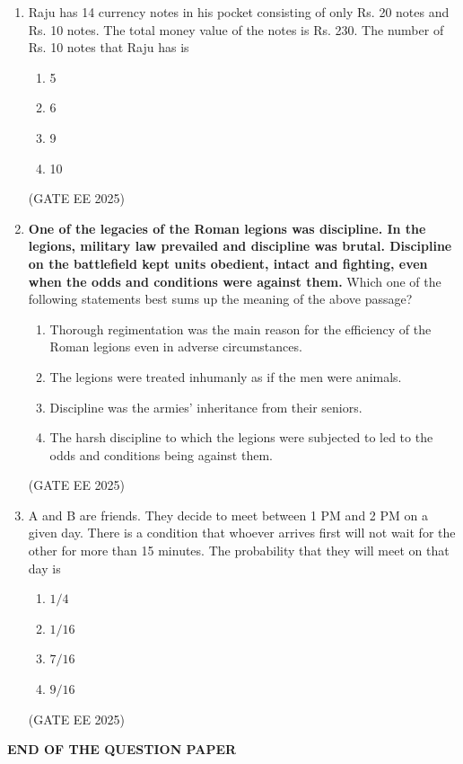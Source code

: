 \documentclass[11pt, letterpaper]{article}
\theoremstyle{remark}
\begin{document}
\begin{enumerate}
\item Raju has 14 currency notes in his pocket consisting of only Rs. 20 notes and Rs. 10 notes. The total money value of the notes is Rs. 230. The number of Rs. 10 notes that Raju has is
\begin{multicols}{2}
\begin{enumerate}  
\item 5
\item 6
\item 9
\item 10
\end{enumerate}
\end{multicols}
\hfill(GATE EE 2025)

\item \textbf{One of the legacies of the Roman legions was discipline. In the legions, military law prevailed and discipline was brutal. Discipline on the battlefield kept units obedient, intact and fighting, even when the odds and conditions were against them.}
Which one of the following statements best sums up the meaning of the above passage?
\begin{multicols}{2}
\begin{enumerate}  
\item Thorough regimentation was the main reason for the efficiency of the Roman legions even in adverse circumstances.
\item The legions were treated inhumanly as if the men were animals.
\item Discipline was the armies' inheritance from their seniors.
\item The harsh discipline to which the legions were subjected to led to the odds and conditions being against them.
\end{enumerate}
\end{multicols}
\hfill(GATE EE 2025)

\item A and B are friends. They decide to meet between 1 PM and 2 PM on a given day. There is a condition that whoever arrives first will not wait for the other for more than 15 minutes. The probability that they will meet on that day is
\begin{multicols}{2}
\begin{enumerate}  
\item $1/4$
\item $1/16$
\item $7/16$
\item $9/16$
\end{enumerate}
\end{multicols}
\hfill(GATE EE 2025)

\end{enumerate}



\begin{center}
\textbf{END OF THE QUESTION PAPER}
\end{center}
\end{document}
